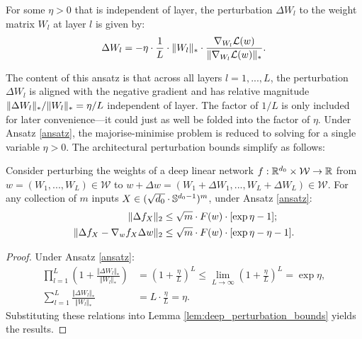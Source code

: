 \begin{refsection}
\begin{ansatz}\label{ansatz} For some $\eta>0$ that is independent of layer, the perturbation $\Delta W_l$ to the weight matrix $W_l$ at layer $l$ is given by:
\begin{equation}
    \Delta W_l = - \eta \cdot \frac{1}{L} \cdot \Vert {W_l} \Vert_* \cdot \frac{ \nabla_{W_l} \mathcal{L}(w)}{\Vert { \nabla_{W_l} \mathcal{L}(w)} \Vert_*}.
\end{equation}
\end{ansatz}
The content of this ansatz is that across all layers $l=1,...,L$, the perturbation $\Delta W_l$ is aligned with the negative gradient and has relative magnitude $\Vert {\Delta W_l} \Vert_*/\Vert {W_l} \Vert_*  = \eta/L$ independent of layer. The factor of $1/L$ is only included for later convenience---it could just as well be folded into the factor of $\eta$. Under Ansatz \ref{ansatz}, the majorise-minimise problem is reduced to solving for a single variable $\eta>0$. The architectural perturbation bounds simplify as follows:
\begin{lemma}\label{lem:arch-perturb-ansatz}
Consider perturbing the weights of a deep linear network $f:\mathbb{R}^{d_0}\times\mathcal{W}\to\mathbb{R}$ from $w=(W_1,...,W_L)\in\mathcal{W}$ to $w+\Delta w=(W_1+\Delta W_1,...,W_L+\Delta W_L)\in\mathcal{W}$. For any collection of $m$ inputs $X\in (\sqrt{d_0}\cdot\mathbb{S}^{d_0-1})^m$, under Ansatz \ref{ansatz}:
    \begin{align}
        \Vert {\Delta f_X} \Vert_2 &\leq \sqrt{m} \cdot F(w) \cdot [\exp \eta - 1];\label{eq:drt-ansatz}\\
        \Vert {\Delta f_X - \nabla_w f_X \Delta w} \Vert_2 &\leq \sqrt{m} \cdot F(w) \cdot [\exp \eta - \eta - 1].\label{eq:jrt-ansatz}
    \end{align}
\end{lemma}
\begin{proof}
Under Ansatz \ref{ansatz}:
\begin{align*}
    \prod_{l=1}^L \left( 1 + \frac{\Vert \Delta W_l \Vert_{*}}{\Vert W_l \Vert_{*}}\right) &= \left( 1 + \frac{\eta}{L}\right)^L \leq \lim_{L\to\infty} \left( 1 + \frac{\eta}{L}\right)^L = \exp \eta,\\
    \sum_{l=1}^L \frac{\Vert \Delta W_l \Vert_{*}}{\Vert W_l \Vert_{*}} &= L\cdot \frac{\eta}{L} = \eta.
\end{align*}
Substituting these relations into Lemma \ref{lem:deep_perturbation_bounds} yields the results.
\end{proof}


\end{refsection}
